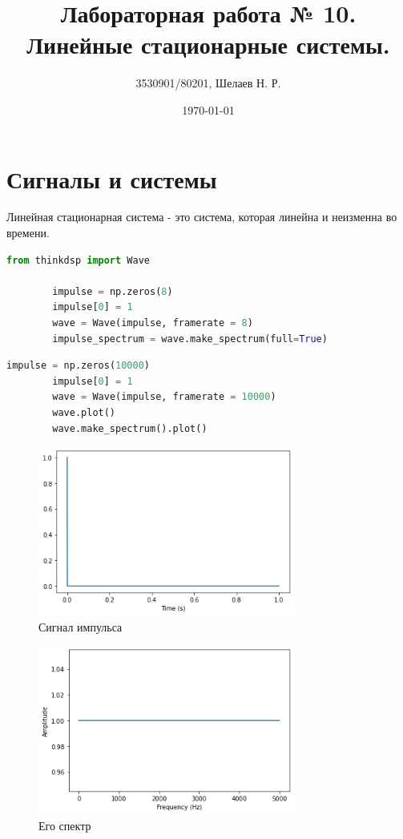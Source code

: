 \documentclass[a4paper, 12pt]{report}
\author{3530901/80201, Шелаев Н. Р.}
\title{Лабораторная работа № 10. Линейные стационарные системы.}
\date{\today}
\begin{document}
	\maketitle
	\tableofcontents
	\listoffigures
	\lstlistoflistings

	\chapter{Сигналы и системы}
	Линейная стационарная система - это система, которая линейна и неизменна во времени.
	\begin{lstlisting}[language=Python,caption=Строим импульс]
		from thinkdsp import Wave

		impulse = np.zeros(8)
		impulse[0] = 1
		wave = Wave(impulse, framerate = 8)
		impulse_spectrum = wave.make_spectrum(full=True)
	\end{lstlisting}
	\begin{lstlisting}[language=Python,caption=Исследуем полученный импульс]
		impulse = np.zeros(10000)
		impulse[0] = 1
		wave = Wave(impulse, framerate = 10000)
		wave.plot()
		wave.make_spectrum().plot()	
	\end{lstlisting}
	\begin{figure}[H]
		\centering
		\includegraphics[width=0.75\textwidth]{imp1.png}
		\caption{Сигнал импульса}
		\label{fig:imp1}
	\end{figure}
	\begin{figure}[H]
		\centering
		\includegraphics[width=0.75\textwidth]{imp2.png}
		\caption{Его спектр}
		\label{fig:imp2}
	\end{figure}
\end{document}
